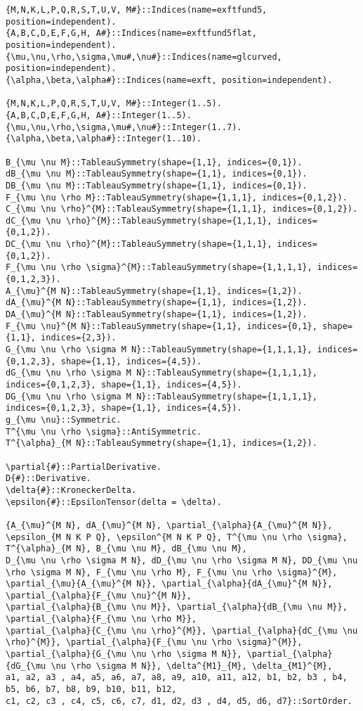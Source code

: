 \documentclass[11pt]{article}
\begin{document}
{\color[named]{Blue}\begin{verbatim}
{M,N,K,L,P,Q,R,S,T,U,V, M#}::Indices(name=exftfund5, position=independent).
{A,B,C,D,E,F,G,H, A#}::Indices(name=exftfund5flat, position=independent).
{\mu,\nu,\rho,\sigma,\mu#,\nu#}::Indices(name=glcurved, position=independent).
{\alpha,\beta,\alpha#}::Indices(name=exft, position=independent).

{M,N,K,L,P,Q,R,S,T,U,V, M#}::Integer(1..5).
{A,B,C,D,E,F,G,H, A#}::Integer(1..5).
{\mu,\nu,\rho,\sigma,\mu#,\nu#}::Integer(1..7).
{\alpha,\beta,\alpha#}::Integer(1..10).

B_{\mu \nu M}::TableauSymmetry(shape={1,1}, indices={0,1}).
dB_{\mu \nu M}::TableauSymmetry(shape={1,1}, indices={0,1}).
DB_{\mu \nu M}::TableauSymmetry(shape={1,1}, indices={0,1}).
F_{\mu \nu \rho M}::TableauSymmetry(shape={1,1,1}, indices={0,1,2}).
C_{\mu \nu \rho}^{M}::TableauSymmetry(shape={1,1,1}, indices={0,1,2}).
dC_{\mu \nu \rho}^{M}::TableauSymmetry(shape={1,1,1}, indices={0,1,2}).
DC_{\mu \nu \rho}^{M}::TableauSymmetry(shape={1,1,1}, indices={0,1,2}).
F_{\mu \nu \rho \sigma}^{M}::TableauSymmetry(shape={1,1,1,1}, indices={0,1,2,3}).
A_{\mu}^{M N}::TableauSymmetry(shape={1,1}, indices={1,2}).
dA_{\mu}^{M N}::TableauSymmetry(shape={1,1}, indices={1,2}).
DA_{\mu}^{M N}::TableauSymmetry(shape={1,1}, indices={1,2}).
F_{\mu \nu}^{M N}::TableauSymmetry(shape={1,1}, indices={0,1}, shape={1,1}, indices={2,3}).
G_{\mu \nu \rho \sigma M N}::TableauSymmetry(shape={1,1,1,1}, indices={0,1,2,3}, shape={1,1}, indices={4,5}).
dG_{\mu \nu \rho \sigma M N}::TableauSymmetry(shape={1,1,1,1}, indices={0,1,2,3}, shape={1,1}, indices={4,5}).
DG_{\mu \nu \rho \sigma M N}::TableauSymmetry(shape={1,1,1,1}, indices={0,1,2,3}, shape={1,1}, indices={4,5}).
g_{\mu \nu}::Symmetric.
T^{\mu \nu \rho \sigma}::AntiSymmetric.
T^{\alpha}_{M N}::TableauSymmetry(shape={1,1}, indices={1,2}).

\partial{#}::PartialDerivative.
D{#}::Derivative.
\delta{#}::KroneckerDelta.
\epsilon{#}::EpsilonTensor(delta = \delta).

{A_{\mu}^{M N}, dA_{\mu}^{M N}, \partial_{\alpha}{A_{\mu}^{M N}}, \epsilon_{M N K P Q}, \epsilon^{M N K P Q}, T^{\mu \nu \rho \sigma}, T^{\alpha}_{M N}, B_{\mu \nu M}, dB_{\mu \nu M}, 
D_{\mu \nu \rho \sigma M N}, dD_{\mu \nu \rho \sigma M N}, DD_{\mu \nu \rho \sigma M N}, F_{\mu \nu \rho M}, F_{\mu \nu \rho \sigma}^{M},
\partial_{\mu}{A_{\mu}^{M N}}, \partial_{\alpha}{dA_{\mu}^{M N}}, \partial_{\alpha}{F_{\mu \nu}^{M N}},
\partial_{\alpha}{B_{\mu \nu M}}, \partial_{\alpha}{dB_{\mu \nu M}}, \partial_{\alpha}{F_{\mu \nu \rho M}}, 
\partial_{\alpha}{C_{\mu \nu \rho}^{M}}, \partial_{\alpha}{dC_{\mu \nu \rho}^{M}}, \partial_{\alpha}{F_{\mu \nu \rho \sigma}^{M}},
\partial_{\alpha}{G_{\mu \nu \rho \sigma M N}}, \partial_{\alpha}{dG_{\mu \nu \rho \sigma M N}}, \delta^{M1}_{M}, \delta_{M1}^{M},
a1, a2, a3 , a4, a5, a6, a7, a8, a9, a10, a11, a12, b1, b2, b3 , b4, b5, b6, b7, b8, b9, b10, b11, b12,
c1, c2, c3 , c4, c5, c6, c7, d1, d2, d3 , d4, d5, d6, d7}::SortOrder.


\end{verbatim}}
\end{document}
